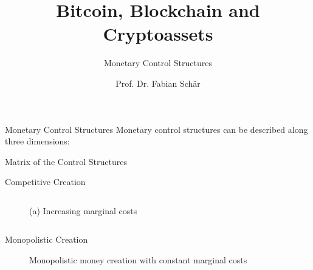\documentclass[]{beamer}
\title{Bitcoin, Blockchain and Cryptoassets}
\subtitle{Monetary Control Structures}
\author{Prof. Dr. Fabian Schär}
\institute{University of Basel}
\begin{document}
\thispagestyle{empty}
\begin{frame}[noframenumbering]
	\titlepage
\end{frame}

\begin{frame}{Monetary Control Structures}
	Monetary control structures can be described along three dimensions:
	\vspace{1.5em}
	\begin{figure}
		
	\end{figure}
\end{frame}

\begin{frame}{Matrix of the Control Structures}
	\begin{figure}
		
	\end{figure}
\end{frame}

\begin{frame}{Competitive Creation}
	\begin{columns}
		\begin{column}{0.5\textwidth}
			\begin{figure}
				
				\caption*{(a) Increasing marginal costs}
			\end{figure}
		\end{column}
		\begin{column}{0.5\textwidth}
			\begin{figure}
			\end{figure}
		\end{column}
	\end{columns}
\end{frame}

\begin{frame}{Monopolistic Creation}
	\begin{figure}
		
		\caption*{Monopolistic money creation with constant marginal costs}
	\end{figure}
\end{frame}
\end{document}
